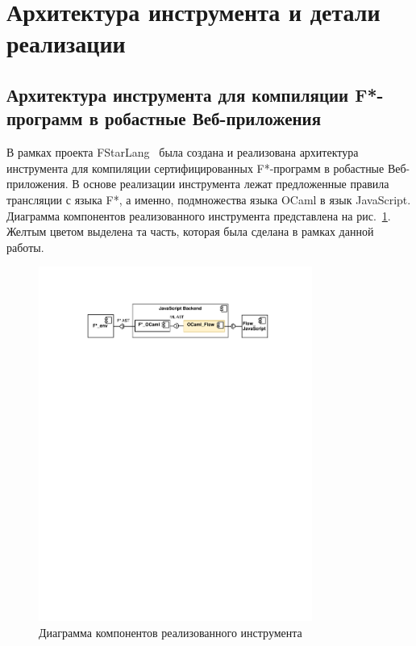 \section{Архитектура инструмента и детали реализации}

\subsection{Архитектура инструмента для компиляции F*-программ в робастные Веб-приложения}

В рамках проекта FStarLang~\cite{fstargh} была создана и реализована архитектура инструмента для компиляции сертифицированных F*-программ в робастные Веб-приложения. В основе реализации инструмента лежат предложенные правила трансляции с языка F*, а именно, подмножества языка OCaml в язык JavaScript. Диаграмма компонентов реализованного инструмента представлена на рис.~\ref{fig:arch_js}. Желтым цветом выделена та часть, которая была сделана в рамках данной работы.

\begin{figure}[h!]
\begin{center}
\includegraphics[width=0.8\textwidth]{Polubelova/DiagComp}
\caption{Диаграмма компонентов реализованного инструмента}
\label{fig:arch_js} 
\end{center}
\end{figure}

